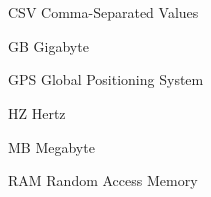 \newpage
\chapter*{\abbreviationName}
\vspace{-0.3em}


\begin{abbrv}
\item[CSV]                  Comma-Separated Values
\item[GB]                   Gigabyte
\item[GPS]                  Global Positioning System
\item[HZ]                   Hertz
\item[MB]                   Megabyte
\item[RAM]                  Random Access Memory
\end{abbrv}